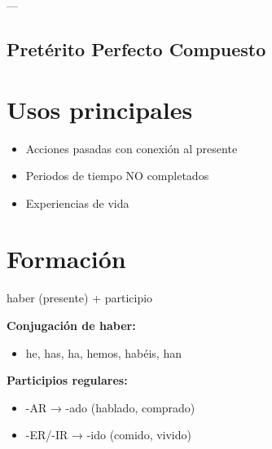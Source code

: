 \documentclass[a4paper,11pt]{article}
\begin{document}
---

\vspace{0.2cm}

\subsection{Pretérito Perfecto Compuesto}

\vspace{0.2cm}

\section{Usos principales}

\begin{itemize}

  \item Acciones pasadas con conexión al presente

  \item Periodos de tiempo NO completados

  \item Experiencias de vida

\end{itemize}

\vspace{0.2cm}

\section{Formación}

haber (presente) + participio

\vspace{0.2cm}

\textbf{Conjugación de haber:}

\begin{itemize}

  \item he, has, ha, hemos, habéis, han

\end{itemize}

\vspace{0.2cm}

\textbf{Participios regulares:}

\begin{itemize}

  \item -AR → -ado (hablado, comprado)

  \item -ER/-IR → -ido (comido, vivido)

\end{itemize}
\end{document}
